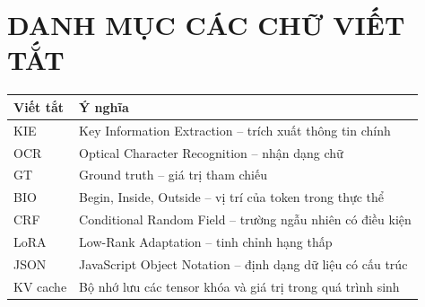\chapter*{DANH MỤC CÁC CHỮ VIẾT TẮT}
\begin{table}[H]
\centering
\renewcommand{\arraystretch}{1.25}
\begin{tabularx}{\textwidth}{lX}
\toprule
\textbf{Viết tắt} & \textbf{Ý nghĩa} \\
\midrule
KIE & Key Information Extraction -- trích xuất thông tin chính \\
OCR & Optical Character Recognition -- nhận dạng chữ \\
GT & Ground truth -- giá trị tham chiếu \\
BIO & Begin, Inside, Outside -- vị trí của token trong thực thể \\
CRF & Conditional Random Field -- trường ngẫu nhiên có điều kiện \\
LoRA & Low-Rank Adaptation -- tinh chỉnh hạng thấp \\
JSON & JavaScript Object Notation -- định dạng dữ liệu có cấu trúc \\
KV cache & Bộ nhớ lưu các tensor khóa và giá trị trong quá trình sinh \\
\bottomrule
\end{tabularx}
\end{table}
\clearpage
{}

